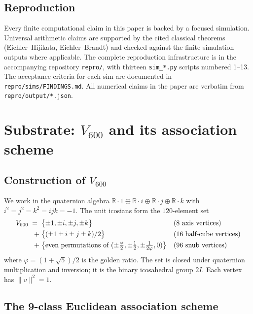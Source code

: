 \documentclass[11pt,a4paper]{article}
\theoremstyle{definition}
\theoremstyle{remark}
\newcommand{\R}{\mathbb{R}}
\begin{document}
\subsection*{Reproduction}

Every finite computational claim in this paper is backed by a focused
simulation. Universal arithmetic claims are supported by the cited
classical theorems (Eichler--Hijikata, Eichler--Brandt) and checked
against the finite simulation outputs where applicable. The complete
reproduction infrastructure is in the accompanying repository
\texttt{repro/}, with thirteen \texttt{sim\_*.py} scripts numbered
1--13. The acceptance criteria for each sim are documented in
\texttt{repro/sims/FINDINGS.md}. All numerical claims in the paper are
verbatim from \texttt{repro/output/*.json}.

\bigskip

\section{Substrate: $V_{600}$ and its association scheme}\label{sec:substrate}

\subsection{Construction of $V_{600}$}

We work in the quaternion algebra $\R \cdot 1 \oplus \R\!\cdot\! i \oplus \R\!\cdot\! j \oplus \R\!\cdot\! k$
with $i^2=j^2=k^2=ijk=-1$. The unit icosians form the $120$-element set
\begin{align}
V_{600} \;=\;
\;& \bigl\{ \pm 1,\pm i,\pm j,\pm k\bigr\} && \text{(8 axis vertices)} \notag \\
+ \;& \bigl\{ (\pm 1 \pm i \pm j \pm k)/2 \bigr\} && \text{(16 half-cube vertices)} \notag \\
+ \;& \bigl\{ \text{even permutations of } (\pm \tfrac{\varphi}{2},\pm \tfrac{1}{2},\pm \tfrac{1}{2\varphi}, 0) \bigr\} && \text{(96 snub vertices)} \notag
\end{align}
where $\varphi = (1+\sqrt 5)/2$ is the golden ratio. The set is closed under
quaternion multiplication and inversion; it is the binary icosahedral group
$2I$. Each vertex has $\|v\|^2 = 1$.

\subsection{The 9-class Euclidean association scheme}
\end{document}
